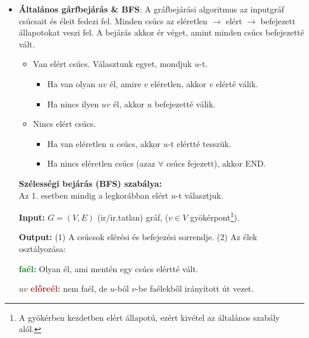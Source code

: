 \documentclass[../../szobeli.tex]{subfiles}
\begin{document}
\begin{center}
    \noindent{}
\end{center}
    \begin{itemize}
        \item \textbf{Általános gárfbejárás \& BFS}: A gráfbejárási algoritmus az inputgráf csúcsait és éleit fedezi fel. Minden csúcs az eléretlen $\rightarrow$ elért $\rightarrow$ befejezett állapotokat veszi fel. A bejárás akkor ér véget, amint minden csúcs befejezetté vált. \begin{itemize}
            \item[1.] Van elért csúcs. Választunk egyet, mondjuk $u$-t. \begin{itemize}
                \item[(1a)] Ha van olyan $uv$ él, amire $v$ eléretlen, akkor $v$ elérté válik.
                \item[(1b)] Ha nincs ilyen $uv$ él, akkor $u$ befejezetté válik.
            \end{itemize}
            \item[1.] Nincs elért csúcs. \begin{itemize}
                \item[(2a)] Ha van eléretlen $u$ csúcs, akkor $u$-t elértté tesszük.
                \item[(2b)] Ha nincs eléretlen csúcs (azaz $\forall$ csúcs fejezett), akkor END.
            \end{itemize} 
        \end{itemize}

        \textbf{Szélességi bejárás (BFS) szabálya:} \\Az 1. esetben mindig a legkorábban elért $u$-t választjuk.

        \textbf{Input:} $G = (V,E)$ (ir/ir.tatlan) gráf, ($v \in V$ gyökérpont\footnote{A gyökérben kezdetben elért állapotú, ezért kivétel az általános szabály alól.}).

			\textbf{Output:} (1) A csúcsok elérési és befejezési sorrendje. (2) Az élek osztályozása:

			\textbf{\textcolor{green}{faél:}} Olyan él, ami mentén egy csúcs elértté vált.

			$uv$ \textbf{\textcolor{brown}{előreél:}} nem faél, de $u$-ból $v$-be faélekből irányított út vezet.


\end{itemize}
\end{document}
